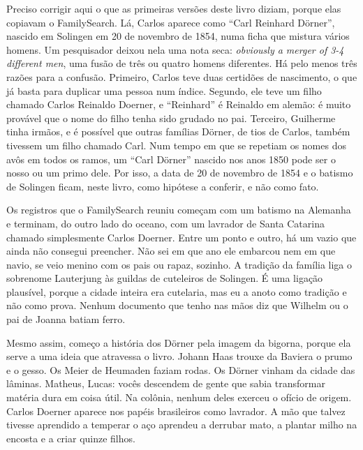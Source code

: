 \documentclass[
  brazilian,
  11pt,
  openany]{book}
\begin{document}
Preciso corrigir aqui o que as primeiras versões deste livro diziam,
porque elas copiavam o FamilySearch. Lá, Carlos aparece como ``Carl
Reinhard Dörner'', nascido em Solingen em 20 de novembro de 1854, numa
ficha que mistura vários homens. Um pesquisador deixou nela uma nota
seca: \emph{obviously a merger of 3-4 different men}, uma fusão de três
ou quatro homens diferentes. Há pelo menos três razões para a confusão.
Primeiro, Carlos teve duas certidões de nascimento, o que já basta para
duplicar uma pessoa num índice. Segundo, ele teve um filho chamado
Carlos Reinaldo Doerner, e ``Reinhard'' é Reinaldo em alemão: é muito
provável que o nome do filho tenha sido grudado no pai. Terceiro,
Guilherme tinha irmãos, e é possível que outras famílias Dörner, de tios
de Carlos, também tivessem um filho chamado Carl. Num tempo em que se
repetiam os nomes dos avôs em todos os ramos, um ``Carl Dörner'' nascido
nos anos 1850 pode ser o nosso ou um primo dele. Por isso, a data de 20
de novembro de 1854 e o batismo de Solingen ficam, neste livro, como
hipótese a conferir, e não como fato.

Os registros que o FamilySearch reuniu começam com um batismo na
Alemanha e terminam, do outro lado do oceano, com um lavrador de Santa
Catarina chamado simplesmente Carlos Doerner. Entre um ponto e outro, há
um vazio que ainda não consegui preencher. Não sei em que ano ele
embarcou nem em que navio, se veio menino com os pais ou rapaz, sozinho.
A tradição da família liga o sobrenome Lauterjung às guildas de
cuteleiros de Solingen. É uma ligação plausível, porque a cidade inteira
era cutelaria, mas eu a anoto como tradição e não como prova. Nenhum
documento que tenho nas mãos diz que Wilhelm ou o pai de Joanna batiam
ferro.

Mesmo assim, começo a história dos Dörner pela imagem da bigorna, porque
ela serve a uma ideia que atravessa o livro. Johann Haas trouxe da
Baviera o prumo e o gesso. Os Meier de Heumaden faziam rodas. Os Dörner
vinham da cidade das lâminas. Matheus, Lucas: vocês descendem de gente
que sabia transformar matéria dura em coisa útil. Na colônia, nenhum
deles exerceu o ofício de origem. Carlos Doerner aparece nos papéis
brasileiros como lavrador. A mão que talvez tivesse aprendido a temperar
o aço aprendeu a derrubar mato, a plantar milho na encosta e a criar
quinze filhos.
\end{document}
